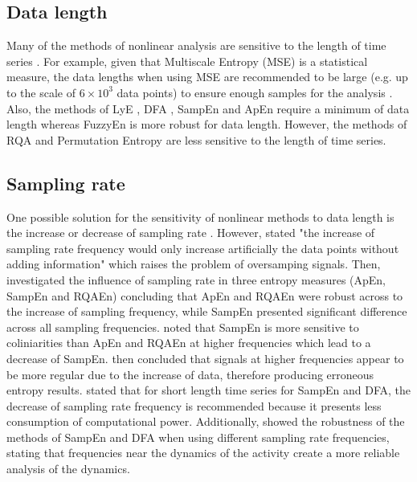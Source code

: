 \subsection{Data length}
Many of the methods of nonlinear analysis are sensitive to the length of
time series \citep{caballero2014}.
For example, given that Multiscale Entropy (MSE) is a  
statistical measure, the data lengths when using MSE are recommended 
to be large (e.g. up to the scale of $6 \times 10^3$ data points) 
to ensure enough samples for the analysis \citep{costa2007}. 
Also, the methods of LyE \citep{wolf1985}, DFA \citep{peng1995}, 
SampEn \citep{rhea2011} and ApEn \citep{richman2000} 
require a minimum of data length whereas 
FuzzyEn \citep{chen2007} is more robust for data length.
However, the methods of RQA \citep{webber1994, riley1999, wijnants2009}
and Permutation Entropy \citep{zunino2009} are less sensitive 
to the length of time series.

\subsection{Sampling rate}
One possible solution for the sensitivity of nonlinear methods 
to data length is the increase or decrease of sampling rate \citep{caballero2014}.
However, \citealt[p. 267]{duarte2008} stated "the increase of sampling rate 
frequency would only increase artificially the data points without 
adding information" which raises the problem of 
oversamping signals. 
Then, \cite{rhea2011} investigated the influence of sampling rate in 
three entropy measures (ApEn, SampEn and RQAEn) concluding that
ApEn and RQAEn were robust across to the increase of sampling frequency,
while SampEn presented significant difference across all sampling 
frequencies. \cite{rhea2011} noted that SampEn is more sensitive to 
coliniarities than ApEn and RQAEn at higher frequencies which lead to a 
decrease of SampEn. \cite{rhea2011} then concluded that signals at 
higher frequencies appear to be more regular due to the increase of data, 
therefore producing erroneous entropy results.
\cite{caballero2013} stated that for short length time series
for SampEn and DFA, the decrease of sampling rate frequency is recommended 
because it presents less consumption of computational power.
Additionally, \cite{caballero2013} showed the robustness of the methods 
of SampEn and DFA when using different sampling rate frequencies, 
stating that frequencies near the dynamics of the activity 
create a more reliable analysis of the dynamics.

